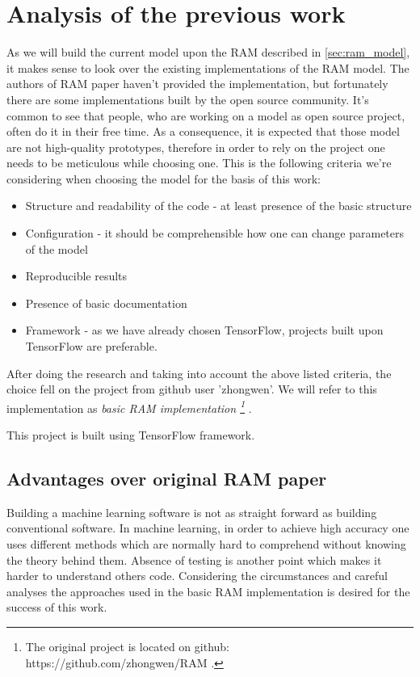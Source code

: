 \section{Analysis of the previous work}
As we will build the current model upon the \gls{RAM} described
in \autoref{sec:ram_model}, it makes sense to look over the existing implementations
of the \gls{RAM} model.
The authors of \gls{RAM} paper haven't provided the implementation, but
fortunately there are some implementations built by the open source community.
It's common to see that people, who are working on a model as open source project,
often do it in their free time. As a consequence, it is expected that those model
are not high-quality prototypes, therefore in order to rely on the project
one needs to be meticulous while choosing one.
This is the following criteria we're considering when choosing the model for the basis
of this work:

\begin{itemize}
	\item Structure and readability of the code - at least presence of the basic structure
	\item Configuration - it should be comprehensible how one can change parameters
		of the model
	\item Reproducible results
	\item Presence of basic documentation
	\item Framework - as we have already chosen TensorFlow, projects built upon
		TensorFlow are preferable.
\end{itemize}

After doing the research and taking into account the above listed criteria,
the choice fell on the project from github user 'zhongwen'. We will refer to
this implementation as \emph{
	basic \gls{RAM} implementation
	\footnote{The original project is located on github: https://github.com/zhongwen/RAM .}
}.

This project is built using TensorFlow framework.
\subsection{Advantages over original RAM paper}
Building a machine learning software is not as straight forward as building
conventional software. In machine learning, in order to achieve high accuracy
one uses different methods which are normally hard to comprehend without knowing
the theory behind them. Absence of testing is another point which makes it
harder to understand others code. Considering the circumstances and careful
analyses the approaches used in the basic RAM implementation
is desired for the success of this work.

